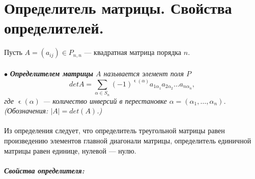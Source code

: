 \section{Определитель матрицы. Свойства определителей.}
Пусть $A = (a_{ij}) \in P_{n,n}$ --- квадратная матрица порядка $n$.\\\\
$\bullet$ \textit{\textbf{Определителем матрицы} $A$ называется элемент поля $P$}
$$det A = \sum\limits_{\alpha \in S_n}(-1)^{\upvarepsilon(\alpha)}a_{1\alpha_1}a_{2\alpha_2}\dots a_{n\alpha_n},$$
\textit{где $\upvarepsilon(\alpha)$ --- количество инверсий в перестановке $\alpha = (\alpha_1,\dots,\alpha_n)$.\\
	(Обозначения: $|A| = det(A)$.)}\\\\
Из определения следует, что определитель треугольной матрицы равен произведению элементов
главной диагонали матрицы, определитель единичной матрицы равен единице, нулевой --- нулю.\\\\
\textbf{\textit{Свойства определителя:}}
